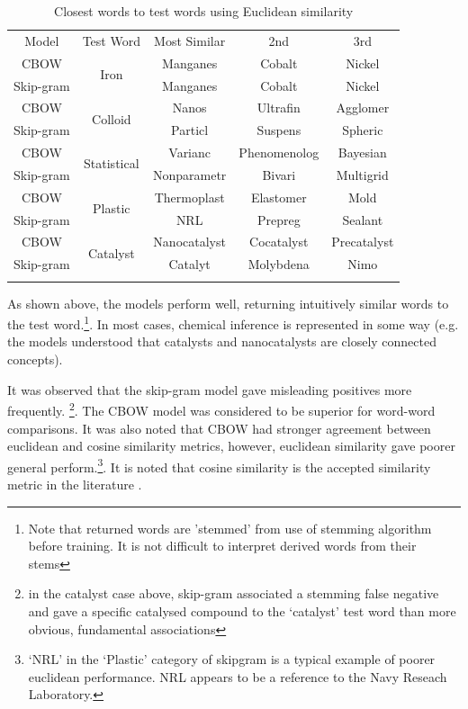 \begin{table}[h!]
\begin{center}
\caption{Closest words to test words using Euclidean similarity}
\label{tab:EUCLIDSIMS}
\begin{tabular}{||c||c|c|c|c||}
\hline
Model     & Test Word              & Most Similar & 2nd & 3rd \\ \hhline{||=||=|=|=|=||}
CBOW      & \multirow{2}{*}{Iron} & Manganes             &  Cobalt   &   Nickel  \\ \cline{1-1} \cline{3-5} 
Skip-gram &                   &  Manganes            &   Cobalt  &  Nickel   \\ 
\hhline{||=||=|=|=|=||}
CBOW      & \multirow{2}{*}{Colloid} & Nanos             &  Ultrafin   &   Agglomer  \\ \cline{1-1} \cline{3-5} 
Skip-gram &                   &  Particl            &   Suspens  &  Spheric   \\ 
\hhline{||=||=|=|=|=||}
CBOW      & \multirow{2}{*}{Statistical} & Varianc             &  Phenomenolog   &   Bayesian  \\ \cline{1-1} \cline{3-5} 
Skip-gram &                   &  Nonparametr            &   Bivari  &  Multigrid   \\ 
\hhline{||=||=|=|=|=||}
CBOW      & \multirow{2}{*}{Plastic} & Thermoplast             &  Elastomer   & Mold    \\ \cline{1-1} \cline{3-5} 
Skip-gram &                   &  NRL            &   Prepreg  &  Sealant   \\ 
\hhline{||=||=|=|=|=||}
CBOW      & \multirow{2}{*}{Catalyst} & Nanocatalyst             &  Cocatalyst   & Precatalyst    \\ \cline{1-1} \cline{3-5} 
Skip-gram &                   &  Catalyt            &   Molybdena  &  Nimo   \\ 
\hhline{||=||=|=|=|=||}
\end{tabular}
\end{center}
\end{table}
As shown above, the models perform well, returning intuitively similar words to the test word.\footnote{Note that returned words are 'stemmed' from use of stemming algorithm before training. It is not difficult to interpret derived words from their stems}. In most cases, chemical inference is represented in some way (e.g. the models understood that catalysts and nanocatalysts are closely connected concepts).

It was observed that the skip-gram model gave misleading positives more frequently. \footnote{in the catalyst case above, skip-gram associated a stemming false negative and gave a specific catalysed compound to the `catalyst' test word than more obvious, fundamental associations}. The CBOW model was considered to be superior for word-word comparisons. It was also noted that CBOW had stronger agreement between euclidean and cosine similarity metrics, however, euclidean similarity gave poorer general perform.\footnote{`NRL' in the `Plastic' category of skipgram is a typical example of poorer euclidean performance. NRL appears to be a reference to the Navy Reseach Laboratory. }. It is noted that cosine similarity is the accepted similarity metric in the literature \cite{word2vec1} \cite{word2vec2} \cite{doc2vec}.

